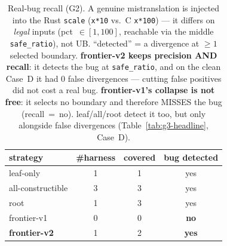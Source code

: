 \begin{table}[t]
  \centering
  \caption{Real-bug recall (G2). A genuine mistranslation is injected into the
    Rust \texttt{scale} (\texttt{x*10} vs.\ C \texttt{x*100}) --- it differs on
    \emph{legal} inputs (pct~$\in[1,100]$, reachable via the middle
    \texttt{safe\_ratio}), not UB. ``detected'' = a divergence at $\ge 1$ selected
    boundary. \textbf{frontier-v2 keeps precision AND recall}: it detects the bug
    at \texttt{safe\_ratio}, and on the clean Case~D it had 0 false divergences ---
    cutting false positives did not cost a real bug. \textbf{frontier-v1's collapse
    is not free}: it selects no boundary and therefore MISSES the bug
    (recall~=~no). leaf/all/root detect it too, but only alongside false
    divergences (Table~\ref{tab:g3-headline}, Case~D).}
  \label{tab:g2-recall}
  \begin{tabular}{lccc}
    \toprule
    strategy & \#harness & covered & bug detected \\
    \midrule
    leaf-only            & 1 & 1 & yes \\
    all-constructible    & 3 & 3 & yes \\
    root                 & 1 & 3 & yes \\
    frontier-v1          & 0 & 0 & \textbf{no} \\
    \textbf{frontier-v2} & 1 & 2 & \textbf{yes} \\
    \bottomrule
  \end{tabular}
\end{table}


